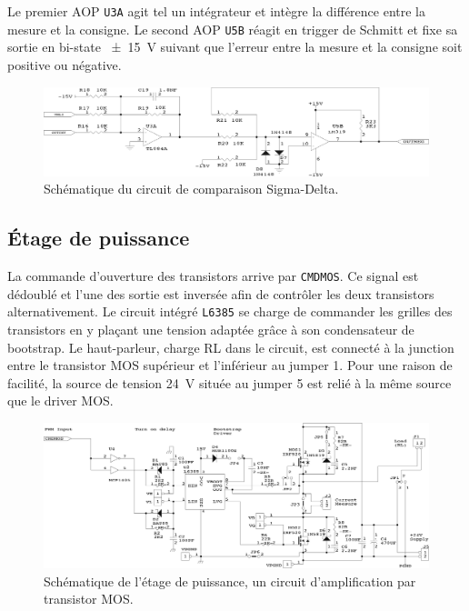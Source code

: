 \documentclass[10pt, oneside, a4paper]{article}
\begin{document}
Le premier AOP \texttt{U3A} agit tel un intégrateur et intègre la différence entre la mesure et la consigne.
Le second AOP \texttt{U5B} réagit en trigger de Schmitt et fixe sa sortie en bi-state \SI{\pm15}{\volt} suivant que l'erreur entre la mesure et la consigne soit positive ou négative.

\begin{figure}[!ht]
	\centering
	\includegraphics[width=\textwidth]{image/sch-ctrl.png}
	\caption{Schématique du circuit de comparaison Sigma-Delta.}
	\label{fig:sch-ctrl}
\end{figure}

\subsection{Étage de puissance}
La commande d'ouverture des transistors arrive par \texttt{CMDMOS}.
Ce signal est dédoublé et l'une des sortie est inversée afin de contrôler les deux transistors alternativement.
Le circuit intégré \texttt{L6385} se charge de commander les grilles des transistors en y plaçant une tension adaptée grâce à son condensateur de bootstrap.
Le haut-parleur, charge RL dans le circuit, est connecté à la junction entre le transistor MOS supérieur et l'inférieur au jumper 1.
Pour une raison de facilité, la source de tension \SI{24}{\volt} située au jumper 5 est relié à la même source que le driver MOS.

\begin{figure}[!ht]
	\centering
	\includegraphics[width=\textwidth]{image/sch-mos.png}
	\caption{Schématique de l'étage de puissance, un circuit d'amplification par transistor
			 MOS.}
	\label{fig:sch-mos}
\end{figure}
\end{document}
